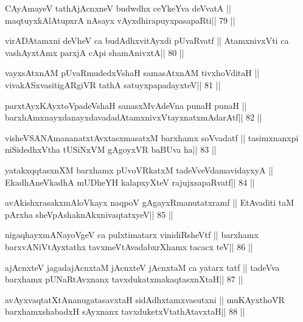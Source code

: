 \begin{shl}
CAyAmayeV tathA\s jAcnxneV budwdhx ceYkeYva deVvatA ||
maqtuyxkAlAtupxrA nAsayx vAyxdhirapuyxpasapaRti\hfill || 79 ||
\end{shl}

\begin{shl}
virADAtamxni deVheV ca budAdhxvitAyxdi pUvaRvatf ||
AtamxnivxVti ca vashAyxtAmx parxjA cApi shamAnivxtA\hfill || 80 ||
\end{shl}

\begin{shl}
vayxsAtxnAM pUvaRmudedxVshaH samasAtxnAM tivxhoVditaH ||
vivakASxvasitigARgiVR tathA satuyxpapadayxteV\hfill || 81 ||
\end{shl}

\begin{shl}
parxtAyxKAyxtoVpadeVshaH sanasxMvAdeVna punaH punaH ||
barxhAmxnayxdanayxdavadadAtamxnivxVtayxnatxmAdarAtf\hfill || 82 ||
\end{shl}

\begin{shl}
visheVSANAmananatxtAvxtasxmasatxM barxhamx soV\s vadatf ||
tasimxnanxpi niSidedhxV\s tha tUSiNxVM gAgoyxVR baBUva ha\hfill || 83 ||
\end{shl}

\begin{shl}
yatakxqqtasxnXM barxhamx pUvoVRkatxM tadeVveVdamavidayxyA ||
EkadhA\s neVkadhA mUDheYH kalapxyXteV rajujxsapaRvatf\hfill || 84 ||
\end{shl}

\begin{shl}
avAkishxrasakxmAloVkayx naqpoV gAgayxRmanutatxramf ||
EtAvaditi taM pArxha sheVpAshaknAkxnivaqtatxyeV\hfill || 85 ||
\end{shl}

\begin{shl}
nigaqhayxmANayoVgeV ca pulxtimatarx vinidiRsheVtf ||
barxhamx barxvANiVtAyxtathx tavxmeVtAvadabxrXhamx tacacx teV\hfill || 86 ||
\end{shl}

\begin{shl}
ajAcnxteV jagadajAcnxtaM jAcnxteV jAcnxtaM ca yatarx tatf ||
tadeVva barxhamx pUNaRtAvxnanx tavxdukatxmakaqtasxnXtaH\hfill || 87 ||
\end{shl}

\begin{shl}
avAyxvaqtatXtAnanugatasavxtaH sidAdhxtamxvasutxni ||
muKAyxthoVR barxhamxshabadxH sAyxnanx tavxduketxV\s tathAtavxtaH\hfill || 88 ||
\end{shl}

